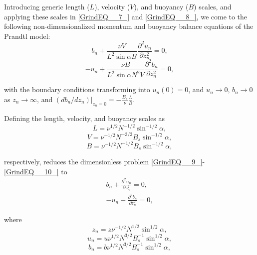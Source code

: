 \documentclass[gmd]{copernicus}
\begin{document}
Introducing generic length ($L$), velocity ($V$), and buoyancy ($B$) scales, and applying these scales in \eqref{GrindEQ__7_} and \eqref{GrindEQ__8_}, we come to the following non-dimensionalized momentum and buoyancy balance equations of the Prandtl model:
\begin{equation} \label{GrindEQ__9_} 
b_{n} +\frac{\nu V}{L^{2} \sin \alpha B} \frac{\partial ^{2} u_{n} }{\partial z_{n} ^{2} } =0,  
\end{equation} 
\begin{equation} \label{GrindEQ__10_} 
-u_{n} +\frac{\nu B}{L^{2} \sin \alpha N^{2} V} \frac{\partial ^{2} b_{n} }{\partial z_{n} ^{2} } =0,  
\end{equation} 

\noindent with the boundary conditions transforming into $u_{n} (0)=0$, and $u_{n} \to 0$, $b_{n} \to 0$ as $z_{n} \to \infty $, and $\left. (db_{n} /dz_{n} )\right|_{z_{n} =0} =-\frac{B_{s} }{\nu } \frac{L}{B} $.

Defining the length, velocity, and buoyancy scales as
\begin{equation} \label{GrindEQ__11_}
L=\nu ^{1/2} N^{-1/2} \sin ^{-1/2} \alpha ,
\end{equation}
\begin{equation} \label{GrindEQ__12_}
V=\nu ^{-1/2} N^{-3/2} B_{s} \sin ^{-1/2} \alpha ,
\end{equation}
\begin{equation} \label{GrindEQ__13_}
B=\nu ^{-1/2} N^{-1/2} B_{s} \sin ^{-1/2} \alpha ,
\end{equation}
 
\noindent respectively, reduces the dimensionless problem \eqref{GrindEQ__9_}-\eqref{GrindEQ__10_} to
\begin{eqnarray} \label{GrindEQ__14_} 
b_{n} +\frac{\partial ^{2} u_{n} }{\partial z_{n} ^{2} } =0, \\-u_{n} +\frac{\partial ^{2} b_{n} }{\partial z_{n} ^{2} } =0,  
\end{eqnarray} 

\noindent where
\begin{equation} \label{GrindEQ__15_}
z_{n} =z\nu ^{-1/2} N^{1/2} \sin ^{1/2} \alpha ,
\end{equation}
\begin{equation} \label{GrindEQ__16_}
u_{n} =u\nu ^{1/2} N^{3/2} B_{s} ^{-1} \sin ^{1/2} \alpha ,
\end{equation}
\begin{equation} \label{GrindEQ__17_}
b_{n} =b\nu ^{1/2} N^{3/2} B_{s} ^{-1} \sin ^{1/2} \alpha ,
\end{equation}
 
\end{document}

